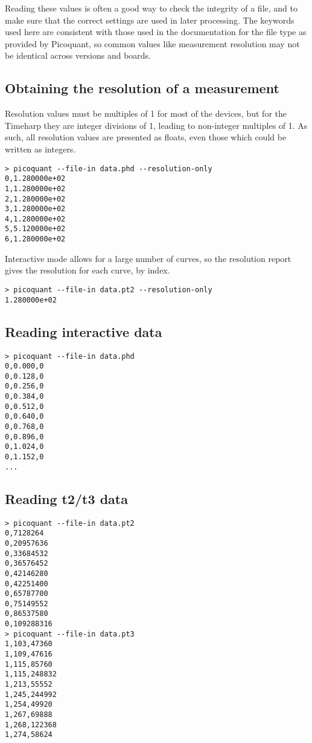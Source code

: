 \documentclass{article}
\begin{document}
Reading these values is often a good way to check the integrity of a file, and to make sure that the correct settings are used in later processing. The keywords used here are consistent with those used in the documentation for the file type as provided by Picoquant, so common values like measurement resolution may not be identical across versions and boards. 

\subsection{Obtaining the resolution of a measurement}
Resolution values must be multiples of 1\pico\second{} for most of the devices, but for the Timeharp they are integer divisions of 1\nano\second, leading to non-integer multiples of 1\pico\second. As such, all resolution values are presented as floats, even those which could be written as integers.
\begin{verbatim}
> picoquant --file-in data.phd --resolution-only
0,1.280000e+02
1,1.280000e+02
2,1.280000e+02
3,1.280000e+02
4,1.280000e+02
5,5.120000e+02
6,1.280000e+02
\end{verbatim}
Interactive mode allows for a large number of curves, so the resolution report gives the resolution for each curve, by index.
\begin{verbatim}
> picoquant --file-in data.pt2 --resolution-only
1.280000e+02
\end{verbatim}

\subsection{Reading interactive data}
\begin{verbatim}
> picoquant --file-in data.phd
0,0.000,0
0,0.128,0
0,0.256,0
0,0.384,0
0,0.512,0
0,0.640,0
0,0.768,0
0,0.896,0
0,1.024,0
0,1.152,0
...
\end{verbatim}

\subsection{Reading t2/t3 data}
\begin{verbatim}
> picoquant --file-in data.pt2
0,7128264
0,20957636
0,33684532
0,36576452
0,42146280
0,42251400
0,65787700
0,75149552
0,86537580
0,109288316
> picoquant --file-in data.pt3
1,103,47360
1,109,47616
1,115,85760
1,115,248832
1,213,55552
1,245,244992
1,254,49920
1,267,69888
1,268,122368
1,274,58624
\end{verbatim}
\end{document}
